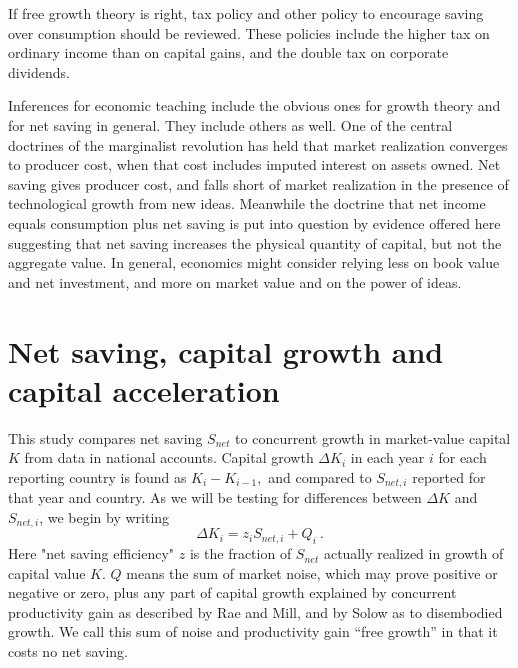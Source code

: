 \documentclass[a4paper,fleqn]{latex_styles/cas-sc}
\begin{document}
If free growth theory is right, tax policy and other policy to encourage
saving over consumption should be reviewed. These policies
include the higher tax on ordinary income than on capital gains, and the
double tax on corporate dividends.

Inferences for economic teaching include the obvious ones for growth
theory and for net saving in general. They include others as well.
One of the central doctrines of the marginalist revolution has held that
market realization converges to producer cost, when that cost includes
imputed interest on assets owned. Net saving gives producer cost,
and falls short of market realization in the presence of technological
growth from new ideas. Meanwhile the doctrine that net income equals
consumption plus net saving is put into question by evidence offered
here suggesting that net saving increases the physical quantity of
capital, but not the aggregate value. In general, economics might
consider relying less on book value and net investment, and more on market value and on the
power of ideas.

\hypertarget{net-saving-and-capital-growth}{%
\section{Net saving, capital growth and capital acceleration}\label{net-saving-and-capital-growth}}

This study compares net saving \(S_{net}\) to concurrent growth in
market-value capital \(K\) from data in national accounts. Capital
growth \({\Delta K}_{i}\) in each year \(i\) for each reporting country
is found as \(K_{i} - K_{i - 1},\) and compared to \(S_{net,i}\)
reported for that year and country. As we will be testing for
differences between \(\Delta K\) and \(S_{net,i}\), we begin by writing
%
\begin{equation}
    \Delta K_{i} = z_{i} S_{net,i} + Q_{i}\ .\label{eq-1}
\end{equation}
%
Here "net saving efficiency" \(z\) is the fraction of \(S_{net}\) actually realized in growth of capital value \(K\). \(Q\) means the sum of market noise, which may prove
positive or negative or zero, plus any part of capital growth explained
by concurrent productivity gain as described by Rae and Mill, and by
Solow as to disembodied growth. We call this sum of noise and
productivity gain ``free growth'' in that it costs no net saving.
\end{document}
